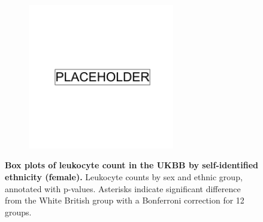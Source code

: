 \begin{figure}
    \centering
    \begin{subfigure}{\textwidth}
    \includegraphics[width=0.7\textwidth]{placeholder.png}
    \end{subfigure}
    \caption[Box plots of leukocyte count in the UKBB by self-identified ethnicity (female)]{\textbf{Box plots of leukocyte count in the UKBB by self-identified ethnicity (female).} Leukocyte counts by sex and ethnic group, annotated with p-values. Asterisks indicate significant difference from the White British group with a Bonferroni correction for 12 groups.}
    \label{fig:supp_box_leukocyte_f}
\end{figure}

\newpage

